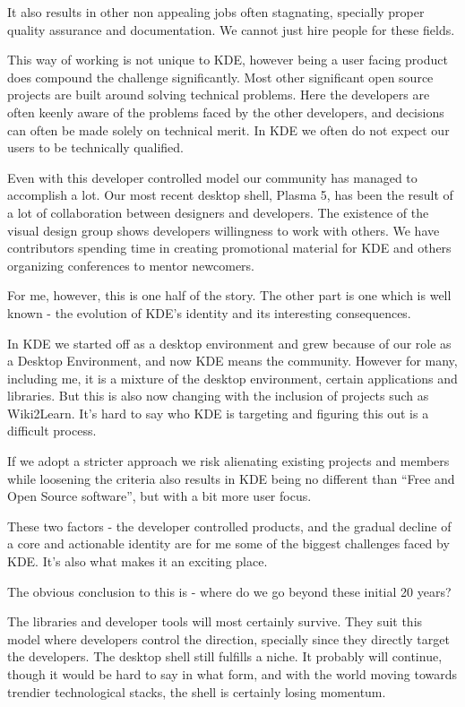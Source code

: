 It also results in other non appealing jobs often stagnating, specially proper quality assurance and documentation. We cannot just hire people for these fields.

This way of working is not unique to KDE, however being a user facing product does compound the challenge significantly. Most other significant open source projects are built around solving technical problems. Here the developers are often keenly aware of the problems faced by the other developers, and decisions can often be made solely on technical merit. In KDE we often do not expect our users to be technically qualified.

Even with this developer controlled model our community has managed to accomplish a lot. Our most recent desktop shell, Plasma 5, has been the result of a lot of collaboration between designers and developers. The existence of the visual design group shows developers willingness to work with others. We have contributors spending time in creating promotional material for KDE and others organizing conferences to mentor newcomers.

For me, however, this is one half of the story. The other part is one which is well known - the evolution of KDE’s identity and its interesting consequences.

In KDE we started off as a desktop environment and grew because of our role as a Desktop Environment, and now KDE means the community. However for many, including me, it is a mixture of the desktop environment, certain applications and libraries. But this is also now changing with the inclusion of projects such as Wiki2Learn. It’s hard to say who KDE is targeting and figuring this out is a difficult process.

If we adopt a stricter approach we risk alienating existing projects and members while loosening the criteria also results in KDE being no different than “Free and Open Source software”, but with a bit more user focus. 

These two factors - the developer controlled products, and the gradual decline of a core and actionable identity are for me some of the biggest challenges faced by KDE. It’s also what makes it an exciting place.

The obvious conclusion to this is - where do we go beyond these initial 20 years?

The libraries and developer tools will most certainly survive. They suit this model where developers control the direction, specially since they directly target the developers. The desktop shell still fulfills a niche. It probably will continue, though it would be hard to say in what form, and with the world moving towards trendier technological stacks, the shell is certainly losing momentum.

